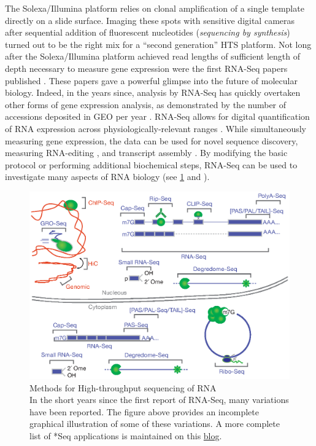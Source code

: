     The Solexa/Illumina platform relies on clonal amplification of a single template directly on a slide surface. Imaging these spots with sensitive digital cameras after sequential addition of fluorescent nucleotides (\textit{sequencing by synthesis}) turned out to be the right mix for a ``second generation'' HTS platform. Not long after the Solexa/Illumina platform achieved read lengths of sufficient length of depth necessary to measure gene expression were the first RNA-Seq papers published \citep{Mortazavi2008, Nagalakshmi2008,Lister2008}. These papers gave a powerful glimpse into the future of molecular biology. Indeed, in the years since, analysis by RNA-Seq has quickly overtaken other forms of gene expression analysis, as demonstrated by the number of accessions deposited in GEO per year \citep{Barrett2013}. RNA-Seq allows for digital quantification of RNA expression across physiologically-relevant ranges \citep{Blencowe2009}. While simultaneously measuring gene expression, the data can be used for novel sequence discovery, measuring RNA-editing \citep{Li2011}, and transcript assembly \citep{Trapnell2010}. By modifying the basic protocol or performing additional biochemical steps, RNA-Seq can be used to investigate many aspects of RNA biology (see \ref{fig:htsMethods} and \citep{Mutz2013}). 

    \begin{figure}[htbp] %
      \centering 
      \includegraphics{Figures/Chapter1/RNA_Sequencing_methodologies.eps}
      \caption[Methods for High-throughput sequencing of RNA]
      {
      Methods for High-throughput sequencing of RNA\\[0.25cm]
      In the short years since the first report of RNA-Seq, many variations have been reported. The figure above provides an incomplete graphical illustration of some of these variations. A more complete list of *Seq applications is maintained on this \href{http://liorpachter.wordpress.com/seq/}{blog}.
      }
      \label{fig:htsMethods}
      \end{figure}

